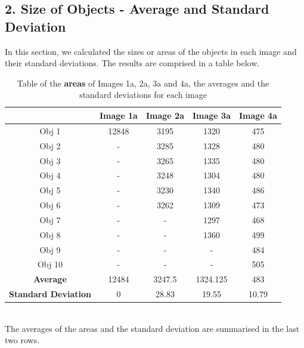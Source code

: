 \documentclass[runningheads]{llncs}
\begin{document}
\subsection*{2. Size of Objects - Average and Standard Deviation}
In this section, we calculated the sizes or areas of the objects in each image and their standard deviations. 
The results are comprised in a table below. 
\begin{table}[h!]
\centering
\begin{tabular}{|c|c|c|c|c|}
\hline
\textbf{} & \textbf{Image 1a} & \textbf{Image 2a} & \textbf{Image 3a} & \textbf{Image 4a} \\
\hline
Obj 1 & 12848  & 3195  & 1320 &  475 \\ \hline
Obj 2 &   -         & 3285  & 1328 &  480\\ \hline
Obj 3 &    -        & 3265  & 1335 &  480\\ \hline
Obj 4 &    -        & 3248  & 1304 &  480\\ \hline
Obj 5 &    -        & 3230  & 1340 &  486\\ \hline
Obj 6 &    -        & 3262  & 1309 &  473\\ \hline
Obj 7 &    -        &  -     & 1297 &  468\\ \hline
Obj 8 &    -        &   -    & 1360 &  499\\ \hline
Obj 9 &    -        &  -     &  -    &  484\\ \hline
Obj 10 &   -         &  -     & -     &  505\\ \hline
\textbf{Average} &   12484    &  3247.5      &   1324.125    & 483  \\ \hline
\textbf{Standard Deviation} &  0      &  28.83      &    19.55   & 10.79  \\ \hline
\end{tabular}
\caption{Table of the \textbf{areas} of Images 1a, 2a, 3a and 4a, the averages and the standard deviations for each image}
\label{tab:Area-ImageSeriesA}
\end{table}
\\ The averages of the areas and the standard deviation are summarised in the last two rows. 
\end{document}
